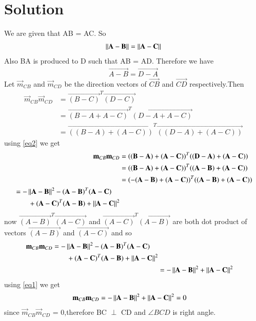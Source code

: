 \documentclass[journal,12pt,twocolumn]{IEEEtran}
\begin{document}
\section{\textbf{Solution}}
\renewcommand{\thefigure}{\arabic{figure}}
\begin{figure}[!h]
  \centering
  \caption{}
  \label{myfig}
\end{figure}
We are given that AB = AC. So
\begin{align}
  \left\lVert\mathbf{A-B}\right\rVert = \left\lVert\mathbf{A-C}\right\rVert \label{eq1}
\end{align}
Also BA is produced to D such that AB = AD. Therefore we have
\begin{align}
  \vec{A-B} = \vec{D-A} \label{eq2}
\end{align}
Let $\vec{m}_{CB}$ and $\vec{m}_{CD}$ be the direction vectors of $\vec{CB}$ and $\vec{CD}$ respectively.Then
\begin{align*}
  \vec{m}_{CB}\vec{m}_{CD} &= \vec{(B-C)}^T\vec{(D-C)}\\
  &= \vec{(B-A+A-C)}^T\vec{(D-A+A-C)}\\
  &= \vec{((B-A)+(A-C))}^T\vec{((D-A)+(A-C))}
\end{align*}
using \eqref{eq2} we get
\begin{align*}
  \mathbf{m}_{CB}\mathbf{m}_{CD} &= \mathbf{((B-A)+(A-C))}^T\mathbf{((D-A)+(A-C))}\\
  &= \mathbf{((B-A)+(A-C))}^T\mathbf{((A-B)+(A-C))}\\
  &= \mathbf{(-(A-B)+(A-C))}^T\mathbf{((A-B)+(A-C))}\\
  \begin{split}
    &= -\left\lVert\mathbf{A-B}\right\rVert^2-\mathbf{(A-B)}^T\mathbf{(A-C)}\\
       &\qquad +\mathbf{(A-C)}^T\mathbf{(A-B)}+\left\lVert\mathbf{A-C}\right\rVert^2
  \end{split}
\end{align*}
now $\vec{(A-B)}^T\vec{(A-C)}$ and $\vec{(A-C)}^T\vec{(A-B)}$ are both dot product of vectors $\vec{(A-B)}$ and $\vec{(A-C)}$ and so
\begin{align*}
  \begin{split}
    \mathbf{m}_{CB}\mathbf{m}_{CD} &= -\left\lVert\mathbf{A-B}\right\rVert^2-\mathbf{(A-B)}^T\mathbf{(A-C)}\\
                                &\qquad +\mathbf{(A-C)}^T\mathbf{(A-B)}+\left\lVert\mathbf{A-C}\right\rVert^2
  \end{split}\\
  &= -\left\lVert\mathbf{A-B}\right\rVert^2+\left\lVert\mathbf{A-C}\right\rVert^2
\end{align*}
using \eqref{eq1} we get
\begin{align}
  \mathbf{m}_{CB}\mathbf{m}_{CD} &= -\left\lVert\mathbf{A-B}\right\rVert^2+\left\lVert\mathbf{A-C}\right\rVert^2 = 0
\end{align}
since $\vec{m}_{CB}\vec{m}_{CD}$ = 0,therefore BC $\perp$ CD and $\angle{BCD}$ is right angle.
\end{document}

